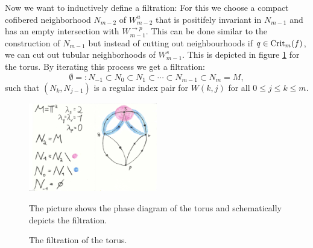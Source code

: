 \begin{definition}
Now we want to inductively define a filtration: 
For this we choose a compact cofibered neighborhood $N_{m-2}$ of $W^{u}_{m-2}$ that is positifely invariant in $N_{m-1}$ and has an empty intersection with $W^{\to p}_{m-1}$. This can be done similar to the construction of $N_{m-1}$ but instead of cutting out neighbourhoods if $q\in \mathrm{Crit}_{m}(f)$, we can cut out tubular neighborhoods of $W^{s}_{m-1}$. This is depicted in figure \ref{fig: Definition of the filtration} for the torus. By iterating this process we get a filtration: 
\begin{equation} \label{eq: Filtration conley}
    \emptyset=:N_{-1}\subset N_0\subset N_1\subset \cdots \subset N_{m-1}\subset N_m=M,
\end{equation} such that $(N_k,N_{j-1})$ is a regular index pair for $W(k,j)$ for all $0\leq j \leq k\leq m$.
\end{definition}
\begin{figure}[p!]
    \centering
    \includegraphics[width=0.5\textwidth]{Text/Pictures/Filtration.png}
    \caption{The filtration of the torus.}
    \label{fig: Definition of the filtration}
The picture shows the phase diagram of the torus and schematically depicts the filtration. 
\end{figure}\clearpage
